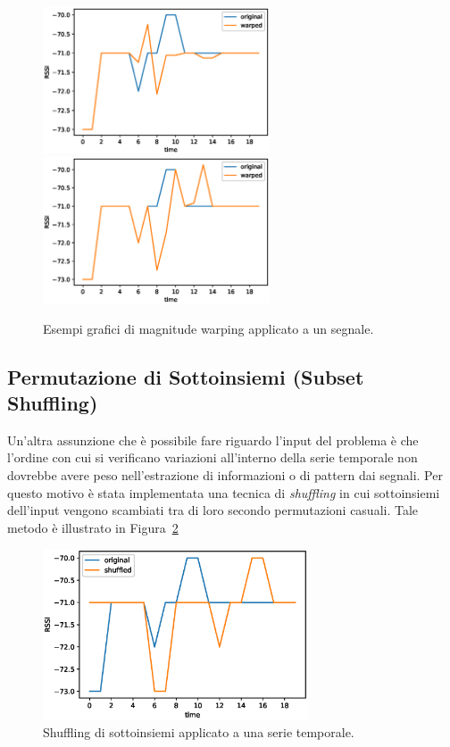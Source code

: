 \begin{figure}[!tp]
  \centering
  \includegraphics[width=0.60\textwidth]{./img/warping.eps}
  \includegraphics[width=0.60\textwidth]{./img/warping2.eps}
  \caption{Esempi grafici di magnitude warping applicato a un segnale.}%
  \label{fig:warping}%
\end{figure}

\subsection{Permutazione di Sottoinsiemi (Subset Shuffling)}
Un'altra assunzione che è possibile fare riguardo l'input del problema è che
l'ordine con cui si verificano variazioni all'interno della serie temporale non
dovrebbe avere peso nell'estrazione di informazioni o di pattern dai segnali.
Per questo motivo è stata implementata una tecnica di \emph{shuffling} in cui
sottoinsiemi dell'input vengono scambiati tra di loro secondo permutazioni
casuali. Tale metodo è illustrato in Figura~\ref{fig:shuffling}
\begin{figure}[!tp]
  \centering
  \includegraphics[width=0.70\textwidth]{./img/shuffling.eps}
  \caption{Shuffling di sottoinsiemi applicato a una serie temporale.}%
  \label{fig:shuffling}%
\end{figure}
